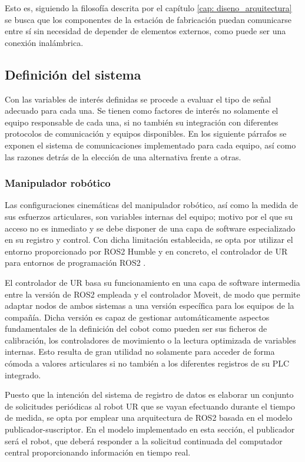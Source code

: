 Esto es, siguiendo la filosofía descrita por el capítulo \ref{cap: diseno_arquitectura} se busca que los componentes de la estación de fabricación puedan comunicarse entre sí sin necesidad de depender de elementos externos, como puede ser una conexión inalámbrica.

\subsection{Definición del sistema}
Con las variables de interés definidas se procede a evaluar el tipo de señal adecuado para cada una. Se tienen como factores de interés no solamente el equipo responsable de cada una, si no también su integración con diferentes protocolos de comunicación y equipos disponibles. En los siguiente párrafos se exponen el sistema de comunicaciones implementado para cada equipo, así como las razones detrás de la elección de una alternativa frente a otras.

\subsubsection*{Manipulador robótico}
\hypertarget{Manipulador robótico}{}
Las configuraciones cinemáticas del manipulador robótico, así como la medida de sus esfuerzos articulares, son variables internas del equipo; motivo por el que su acceso no es inmediato y se debe disponer de una capa de software especializado en su registro y control. Con dicha limitación establecida, se opta por utilizar el entorno proporcionado por ROS2 Humble y en concreto, el controlador de UR para entornos de programación ROS2 \cite{UniversalRobots_ROS2_Driver}.

El controlador de UR basa su funcionamiento en una capa de software intermedia entre la versión de ROS2 empleada y el controlador Moveit, de modo que permite adaptar nodos de ambos sistemas a una versión específica para los equipos de la compañía. Dicha versión es capaz de gestionar automáticamente aspectos fundamentales de la definición del cobot como pueden ser sus ficheros de calibración, los controladores de movimiento o la lectura optimizada de variables internas. Esto resulta de gran utilidad no solamente para acceder de forma cómoda a valores articulares si no también a los diferentes registros de su \acrshort{PLC} integrado.

Puesto que la intención del sistema de registro de datos es elaborar un conjunto de solicitudes periódicas al robot UR que se vayan efectuando durante el tiempo de medida, se opta por emplear una arquitectura de ROS2 basada en el modelo publicador-suscriptor. En el modelo implementado en esta sección, el publicador será el robot, que deberá responder a la solicitud continuada del computador central proporcionando información en tiempo real. 

